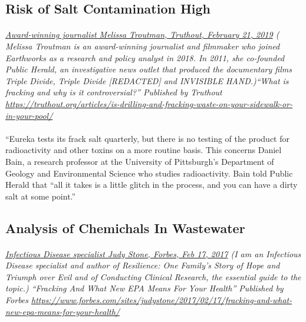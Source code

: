 \documentclass{article}
\begin{document}
\subsection{Risk of Salt Contamination High}
\paragraph{}
\small
\textit{
\underline{Award-winning journalist Melissa Troutman, Truthout, February 21, 2019}
( Melissa Troutman is an award-winning journalist and filmmaker who joined Earthworks as a research and policy analyst in 2018. In 2011, she co-founded Public Herald, an investigative news outlet that produced the documentary films Triple Divide, Triple Divide [REDACTED] and INVISIBLE HAND.)``What is fracking and why is it controversial?'' Published by Truthout
\url{https://truthout.org/articles/is-drilling-and-fracking-waste-on-your-sidewalk-or-in-your-pool/}}
\normalsize
\paragraph{}
``Eureka tests its frack salt quarterly, but there is no testing of the product for radioactivity and other toxins on a more routine basis. This concerns Daniel Bain, a research professor at the University of Pittsburgh’s Department of Geology and Environmental Science who studies radioactivity. Bain told Public Herald that “all it takes is a little glitch in the process, and you can have a dirty salt at some point.”

\subsection{Analysis of Chemichals In Wastewater}
\paragraph{}
\small
\textit{
\underline{Infectious Disease specialist Judy Stone, Forbes, Feb 17, 2017}
(I am an Infectious Disease specialist and author of Resilience: One Family's Story of Hope and Triumph over Evil and of Conducting Clinical Research, the essential guide to the topic.) ``Fracking And What New EPA Means For Your Health'' Published by Forbes   
\url{https://www.forbes.com/sites/judystone/2017/02/17/fracking-and-what-new-epa-means-for-your-health/}}
\normalsize
\end{document}
